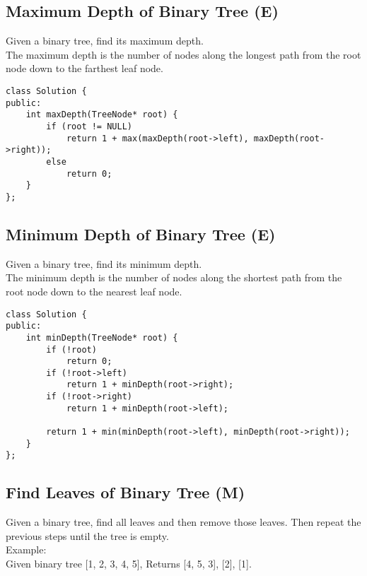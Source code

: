 \subsection{Maximum Depth of Binary Tree (E)}
Given a binary tree, find its maximum depth.\\

The maximum depth is the number of nodes along the longest path from the root node down to the farthest leaf node.\\

\begin{lstlisting}
class Solution {
public:
    int maxDepth(TreeNode* root) {
        if (root != NULL)
            return 1 + max(maxDepth(root->left), maxDepth(root->right));
        else
            return 0;
    }
};
\end{lstlisting}


\subsection{Minimum Depth of Binary Tree (E)}
Given a binary tree, find its minimum depth.\\

The minimum depth is the number of nodes along the shortest path from the root node down to the nearest leaf node.\\

\begin{lstlisting}
class Solution {
public:
    int minDepth(TreeNode* root) {
        if (!root) 
            return 0;
        if (!root->left) 
            return 1 + minDepth(root->right);
        if (!root->right) 
            return 1 + minDepth(root->left);
            
        return 1 + min(minDepth(root->left), minDepth(root->right));
    }
};
\end{lstlisting}


\subsection{Find Leaves of Binary Tree (M)}
Given a binary tree, find all leaves and then remove those leaves. Then repeat the previous steps until the tree is empty.\\

Example:\\
Given binary tree [1, 2, 3, 4, 5], Returns [4, 5, 3], [2], [1].\\

